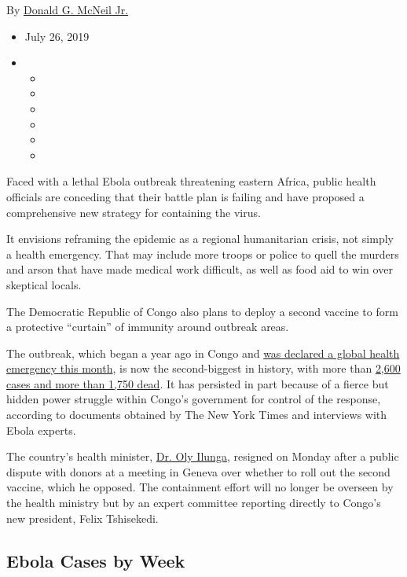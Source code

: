 By
\href{https://www.nytimes3xbfgragh.onion/by/donald-g-mcneil-jr}{Donald
G. McNeil Jr.}

\begin{itemize}
\item
  July 26, 2019
\item
  \begin{itemize}
  \item
  \item
  \item
  \item
  \item
  \item
  \end{itemize}
\end{itemize}

Faced with a lethal Ebola outbreak threatening eastern Africa, public
health officials are conceding that their battle plan is failing and
have proposed a comprehensive new strategy for containing the virus.

It envisions reframing the epidemic as a regional humanitarian crisis,
not simply a health emergency. That may include more troops or police to
quell the murders and arson that have made medical work difficult, as
well as food aid to win over skeptical locals.

The Democratic Republic of Congo also plans to deploy a second vaccine
to form a protective ``curtain'' of immunity around outbreak areas.

The outbreak, which began a year ago in Congo and
\href{https://www.nytimes3xbfgragh.onion/2019/07/17/health/ebola-outbreak.html}{was
declared a global health emergency this month}, is now the
second-biggest in history, with more than
\href{https://who.maps.arcgis.com/apps/opsdashboard/index.html\#/e70c3804f6044652bc37cce7d8fcef6c}{2,600
cases and more than 1,750 dead}. It has persisted in part because of a
fierce but hidden power struggle within Congo's government for control
of the response, according to documents obtained by The New York Times
and interviews with Ebola experts.

The country's health minister,
\href{https://twitter.com/olyilunga?lang=en}{Dr. Oly Ilunga}, resigned
on Monday after a public dispute with donors at a meeting in Geneva over
whether to roll out the second vaccine, which he opposed. The
containment effort will no longer be overseen by the health ministry but
by an expert committee reporting directly to Congo's new president,
Felix Tshisekedi.

\hypertarget{ebola-cases-by-week}{%
\subsection{Ebola Cases by Week}\label{ebola-cases-by-week}}

